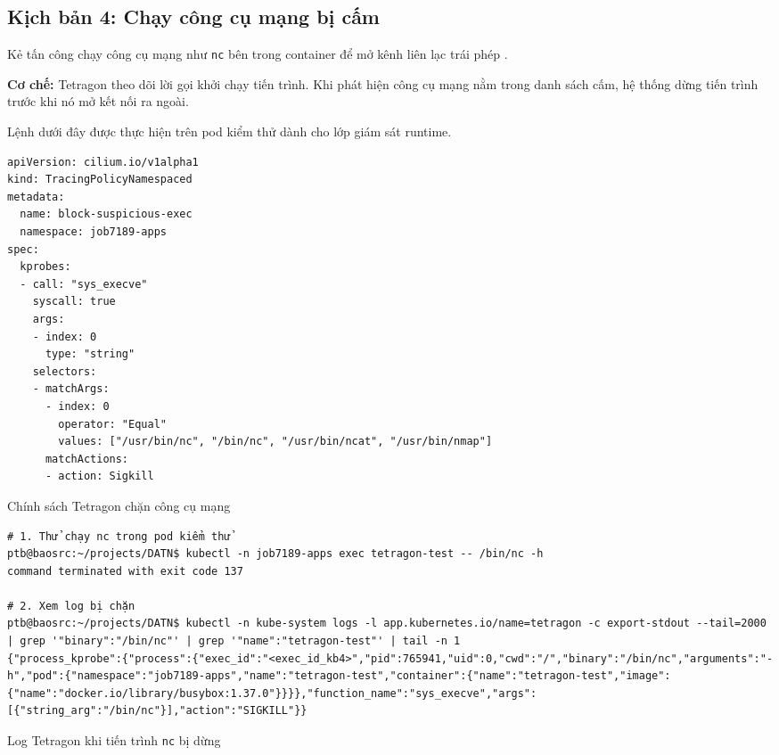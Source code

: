 \subsection{Kịch bản 4: Chạy công cụ mạng bị cấm}
\label{subsec:c3_kb4}

Kẻ tấn công chạy công cụ mạng như \texttt{nc} bên trong container để mở kênh liên lạc trái phép \parencite{mitre_t1059}.

\textbf{Cơ chế:} Tetragon theo dõi lời gọi khởi chạy tiến trình. Khi phát hiện công cụ mạng nằm trong danh sách cấm, hệ thống dừng tiến trình trước khi nó mở kết nối ra ngoài.

Lệnh dưới đây được thực hiện trên pod kiểm thử dành cho lớp giám sát runtime.

\begin{listing}[H]
\begin{verbatim}
apiVersion: cilium.io/v1alpha1
kind: TracingPolicyNamespaced
metadata:
  name: block-suspicious-exec
  namespace: job7189-apps
spec:
  kprobes:
  - call: "sys_execve"
    syscall: true
    args:
    - index: 0
      type: "string"
    selectors:
    - matchArgs:
      - index: 0
        operator: "Equal"
        values: ["/usr/bin/nc", "/bin/nc", "/usr/bin/ncat", "/usr/bin/nmap"]
      matchActions:
      - action: Sigkill
\end{verbatim}
\caption{Chính sách Tetragon chặn công cụ mạng}
\label{lst:c3_kb4_policy}
\end{listing}

\begin{listing}[H]
\begin{verbatim}
# 1. Thử chạy nc trong pod kiểm thử
ptb@baosrc:~/projects/DATN$ kubectl -n job7189-apps exec tetragon-test -- /bin/nc -h
command terminated with exit code 137

# 2. Xem log bị chặn
ptb@baosrc:~/projects/DATN$ kubectl -n kube-system logs -l app.kubernetes.io/name=tetragon -c export-stdout --tail=2000 | grep '"binary":"/bin/nc"' | grep '"name":"tetragon-test"' | tail -n 1
{"process_kprobe":{"process":{"exec_id":"<exec_id_kb4>","pid":765941,"uid":0,"cwd":"/","binary":"/bin/nc","arguments":"-h","pod":{"namespace":"job7189-apps","name":"tetragon-test","container":{"name":"tetragon-test","image":{"name":"docker.io/library/busybox:1.37.0"}}}},"function_name":"sys_execve","args":[{"string_arg":"/bin/nc"}],"action":"SIGKILL"}}
\end{verbatim}
\caption{Log Tetragon khi tiến trình \texttt{nc} bị dừng}
\label{lst:c3_kb4_log}
\end{listing}

